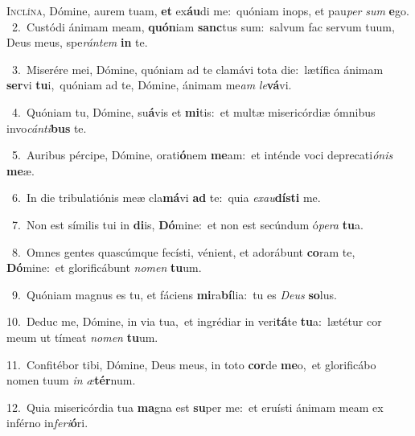 \lettrine{\initial\textcolor{\initialcolor}{I}}{nclína,} Dómine, aurem tuam, \textbf{et} ex\-\textbf{áu}\-di me:~\star quóniam inops, et pau\textit{per} \textit{sum} \textbf{e}\-go.\\
{\numbfont\textcolor{\numbcolor}{~2.}}~Custódi ánimam meam, \textbf{quón}\-iam \textbf{sanc}\-tus sum:~\star salvum fac servum tuum, Deus meus, spe\-\textit{rán}\-\textit{tem} \textbf{in} te.\par
{\numbfont\textcolor{\numbcolor}{~3.}}~Miserére mei, Dómine, quóniam ad te clamávi tota die:~\dagger lætífica ánimam \textbf{ser}\-vi \textbf{tu}\-i,~\star quóniam ad te, Dómine, ánimam me\textit{am} \textit{le}\-\textbf{vá}vi.\par
{\numbfont\textcolor{\numbcolor}{~4.}}~Quóniam tu, Dómine, su\-\textbf{á}\-vis et \textbf{mi}\-tis:~\star et multæ misericórdiæ ómnibus invo\-\textit{cán}\-\textit{ti}\textbf{bus} te.\par
{\numbfont\textcolor{\numbcolor}{~5.}}~Auribus pércipe, Dómine, orati\-\textbf{ó}\-nem \textbf{me}\-am:~\star et inténde voci deprecati\-\textit{ó}\-\textit{nis} \textbf{me}\-æ.\par
{\numbfont\textcolor{\numbcolor}{~6.}}~In die tribulatiónis meæ cla\-\textbf{má}\-vi \textbf{ad} te:~\star quia \textit{ex}\-\textit{au}\textbf{dís}\textbf{ti} me.\par
{\numbfont\textcolor{\numbcolor}{~7.}}~Non est símilis tui in \textbf{di}\-is, \textbf{Dó}\-mine:~\star et non est secúndum ó\-\textit{pe}\-\textit{ra} \textbf{tu}\-a.\par
{\numbfont\textcolor{\numbcolor}{~8.}}~Omnes gentes quascúmque fecísti, vénient, et adorábunt \textbf{co}\-ram te, \textbf{Dó}\-mine:~\star et glorificábunt \textit{no}\-\textit{men} \textbf{tu}\-um.\par
{\numbfont\textcolor{\numbcolor}{~9.}}~Quóniam magnus es tu, et fáciens \textbf{mi}\-ra\-\textbf{bí}\-lia:~\star tu es \textit{De}\-\textit{us} \textbf{so}\-lus.\par
{\numbfont\textcolor{\numbcolor}{10.}}~Deduc me, Dómine, in via tua,~\dagger et ingrédiar in veri\-\textbf{tá}\-te \textbf{tu}\-a:~\star lætétur cor meum ut tímeat \textit{no}\-\textit{men} \textbf{tu}\-um.\par
{\numbfont\textcolor{\numbcolor}{11.}}~Confitébor tibi, Dómine, Deus meus, in toto \textbf{cor}\-de \textbf{me}\-o,~\star et glorificábo nomen tuum \textit{in} \textit{æ}\-\textbf{tér}num.\par
{\numbfont\textcolor{\numbcolor}{12.}}~Quia misericórdia tua \textbf{ma}\-gna est \textbf{su}\-per me:~\star et eruísti ánimam meam ex inférno in\-\textit{fe}\-\textit{ri}\textbf{ó}ri.\par

